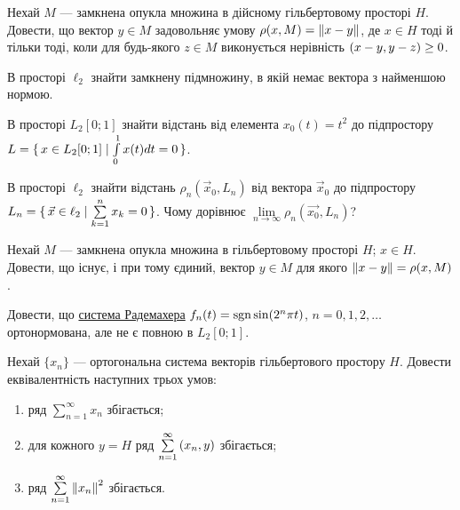 \begin{exercise}
    Нехай $M$ --- замкнена опукла множина в дійсному гільбертовому просторі $H$.
    Довести, що вектор $y \in M$ задовольняє умову $\rho(x, M) = \left\lVert x-y\right\rVert$,
    де $x \in H$ тоді й тільки тоді, коли для будь-якого $z \in M$ виконується
    нерівність $\left(x-y, y-z\right) \geq 0$.
\end{exercise}

\begin{exercise}
    В просторі $\ell_2$ знайти замкнену підмножину, в якій немає вектора з найменшою нормою.
\end{exercise}

\begin{exercise}
    В просторі $L_2[0;1]$ знайти відстань від елемента $x_0(t) = t^2$ до підпростору
    $L = \set{x \in L_2[0;1] \mid \int\limits_0^1x(t)dt = 0}$.
\end{exercise}

\begin{exercise}
    В просторі $\ell_2$ знайти відстань $\rho_n(\vec{x}_0, L_n)$ від вектора $\vec{x}_0$ до
    підпростору $L_n = \set{ \vec{x}\in \ell_2 \mid \sum\limits^n_{k=1} x_k = 0}$.
    Чому дорівнює $\lim\limits_{n \to \infty} \rho_n(\vec{x_0}, L_n)$?
\end{exercise}

\begin{exercise}
    Нехай $M$ --- замкнена опукла множина в гільбертовому просторі $H$; $x \in H$.
    Довести, що існує, і при тому єдиний, вектор $y \in M$ для якого $\left\lVert x-y\right\rVert =
    \rho(x, M)$.
\end{exercise}

\begin{exercise}
    Довести, що \underline{система Радемахера} $f_n(t) = \operatorname{sgn}\sin(2^n \pi t)$,
    $n=0,1,2,\dots$ ортонормована, але не є повною в $L_2[0;1]$.
\end{exercise}

\begin{exercise}
    Нехай $\{x_n\}$ --- ортогональна система векторів гільбертового простору $H$.
    Довести еквівалентність наступних трьох умов:
    \begin{enumerate}[label=\ukr*)]
        \item ряд $\sum\limits^\infty_{n=1} x_n$ збігається;
        \item для кожного $y=H$ ряд $\sum\limits^\infty_{n=1} \left(x_n, y\right)$ збігається;
        \item ряд $\sum\limits^\infty_{n=1} \left\lVert x_n\right\rVert^2$ збігається.
    \end{enumerate}
\end{exercise}

